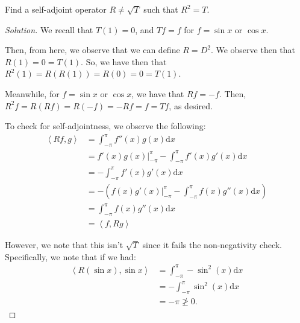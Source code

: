 \documentclass{article}
\newenvironment{solution}{\begin{proof}[Solution]}{\end{proof}}
\newcommand{\innerproduct}[2]{\left\langle{#1}, {#2}\right\rangle}
\begin{document}
\begin{hw}
	Find a self-adjoint operator $R \neq \sqrt{T}$ such that $R^{2} = T$. 
\end{hw}
\begin{solution}
	We recall that $T(1) = 0$, and $Tf = f$ for $f = \sin x$ or $\cos x$.
	
	Then, from here, we observe that we can define $R = D^{2}$. We observe then that $R(1) = 0 = T(1)$. So, we have then that $R^{2}(1) = R(R(1)) = R(0) = 0 = T(1)$.
	
	Meanwhile, for $f = \sin x$ or $\cos x$, we have that $Rf = -f$. Then, $R^{2}f = R(Rf) = R(-f) = -Rf = f = Tf$, as desired.
	
	To check for self-adjointness, we observe the following:
	\begin{align*}
		\innerproduct{Rf}{g} &= \int_{-\pi}^{\pi} f''(x)g(x) \mathrm dx \\
		&= f'(x)g(x) \big|_{-\pi}^{\pi} - \int_{-\pi}^{\pi} f'(x) g'(x) \mathrm dx \\
		&= - \int_{-\pi}^{\pi} f'(x) g'(x) \mathrm dx \\
		&= -\left( f(x)g'(x)\big|_{-\pi}^{\pi} - \int_{-\pi}^{\pi} f(x)g''(x) \mathrm dx \right) \\
		&= \int_{-\pi}^{\pi} f(x) g''(x) \mathrm dx \\
		&= \innerproduct{f}{Rg}
	\end{align*}

	However, we note that this isn't $\sqrt{T}$ since it fails the non-negativity check. Specifically, we note that if we had:
	\begin{align*}
	\innerproduct{R(\sin x)}{\sin x} &= \int_{-\pi}^{\pi} -\sin^{2}(x) \mathrm dx \\
	&= - \int_{-\pi}^{\pi} \sin^2(x) \mathrm dx \\
	&= -\pi \not\geq 0.
	\end{align*}
\end{solution}
\end{document}
